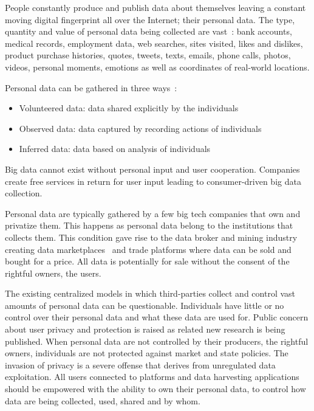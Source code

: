 People constantly produce and publish data about themselves
leaving a constant moving digital fingerprint all over the Internet; their personal data. The type, quantity and value of personal data being collected are vast~\cite{emergence_new_assets_wef}: bank accounts, medical records, employment data, web searches, sites visited,
likes and dislikes, product purchase histories, quotes, tweets, texts, emails, phone calls, photos, videos, personal moments, emotions as well as coordinates of real-world locations.

Personal data can be gathered in three ways~\cite{emergence_new_assets_wef}:

\begin{itemize}
  \item Volunteered data: data shared explicitly by the individuals
  \item Observed data: data captured by recording actions of individuals
  \item Inferred data: data based on analysis of individuals
\end{itemize}

Big data cannot exist without personal input and user cooperation. Companies create free services in return for user input leading to consumer-driven big data collection.

Personal data are typically gathered by a few big tech companies that own and privatize them. This happens as personal data belong to the institutions that collects them.  This condition gave rise to the data broker and mining industry creating data marketplaces~\cite{dawex, q_dx, datastreamx} and trade platforms where data can be sold and bought for a price. All data is potentially for sale without the consent of the rightful owners, the users.

The existing centralized models in which third-parties collect and control vast amounts of personal data can be questionable. Individuals have little or no control over their personal data and what these data are used for. Public concern about user privacy and protection is raised as related new research is being published. When personal data are not controlled by their producers, the rightful owners, individuals are not protected against market and state policies. The invasion of privacy is a severe offense that derives from unregulated data exploitation. All users connected to platforms and data harvesting applications should be empowered with the ability to own their personal data, to control how data are being collected, used, shared and by whom.

